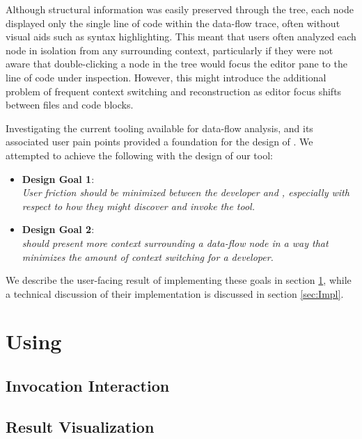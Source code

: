 \par Although structural information was easily preserved through the tree, each node
displayed only the single line of code within the data-flow trace, often
without visual aids such as syntax highlighting.
This meant that users often analyzed each node in isolation from any surrounding
context, particularly if they were not aware that double-clicking a node in the
tree would focus the editor pane to the line of code under inspection.
However, this might introduce the additional problem of frequent context
switching and reconstruction as editor focus shifts between files and code
blocks.

\par Investigating the current tooling available for data-flow analysis, and
its associated user pain points provided a foundation for the design of 
\toolname{}.
We attempted to achieve the following with the design of our tool:

\begin{itemize}
  \item[] \textbf{Design Goal 1}: \\
    \textit{
      User friction should be minimized between the developer and \toolname{},
      especially with respect to how they might discover and invoke the tool.
    }
  \item[] \textbf{Design Goal 2}: \\
  \textit{
    \toolname{} should present more context surrounding a data-flow node in
      a way that minimizes the amount of context switching for a developer.
  }
\end{itemize}

We describe the user-facing result of implementing these goals in section
\ref{sec:UsingReachHover}, while a technical discussion of their implementation 
is discussed in section \ref{sec:Impl}.

\section{Using \toolname{}}
\label{sec:UsingReachHover}

\subsection{Invocation Interaction}
\label{subsection:InvocationInteraction}


\subsection{Result Visualization}
\label{subsection:ResultVisualization}

